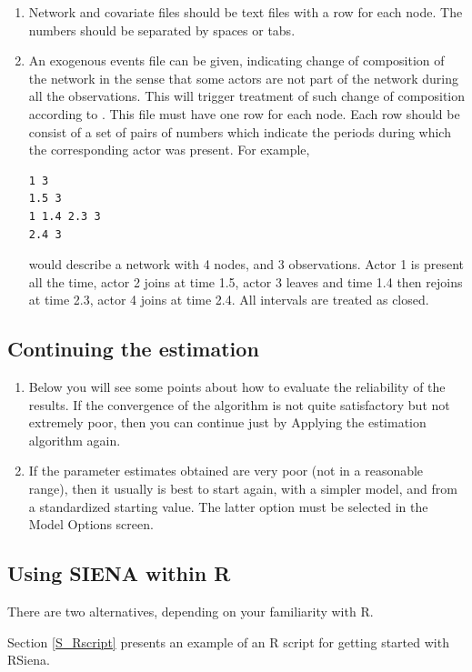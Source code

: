 \documentclass[a4paper,fleqn]{article}
\newcommand{\+}{\, + \,}
\newcommand{\R}{{\sf R }}
\newcommand{\Rn}{{\sf R}}
\newcommand{\rs}{{\sf RSiena}}
\newcommand{\SI}{{\sf SIENA }}
\begin{document}
{\begin{enumerate}
\item
Network and covariate files should be text files with a row for each node. The
numbers should be separated by spaces or tabs.
\item
An exogenous events file can be given, indicating change of composition of the
network in the sense that some actors are not part of the network during
all the observations.
This will trigger treatment of such change of composition
according to \citet{HuismanSnijders03}.
This file must have one row for each node.
Each row should be
consist of a set of pairs of numbers which indicate the periods
during which the corresponding actor
was present. For example,
\begin{verbatim}
1 3
1.5 3
1 1.4 2.3 3
2.4 3
\end{verbatim}
would describe a network with 4 nodes, and 3 observations. Actor 1 is present
all the time, actor 2 joins at time 1.5, actor 3 leaves and time 1.4 then
rejoins at time 2.3, actor 4 joins at time 2.4. All intervals are treated as
closed.
\end{enumerate}
\subsection{Continuing the estimation}
\begin{enumerate}
\item Below you will see some points about how to evaluate the reliability of
  the results.  If the convergence of the algorithm is not quite satisfactory
  but not extremely poor, then you can continue just by \textsf{Apply}ing the
  estimation algorithm again.
\item If the parameter estimates obtained are very poor (not in a reasonable
  range), then it usually is best to start again, with a simpler model, and from
  a standardized starting value.  The latter option must be selected in the
  \textsf{Model Options} screen.
\end{enumerate}
\bigskip

\subsection{Using \SI within \Rn}

There are two alternatives, depending on your familiarity with \Rn.

Section \ref{S_Rscript} presents an example of an \R script
for getting started with \rs.

}
\end{document}
